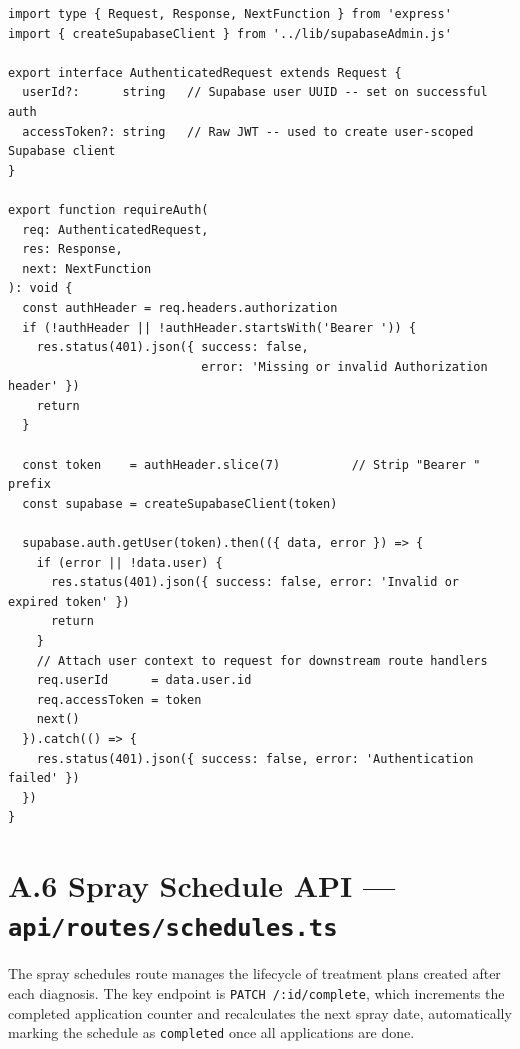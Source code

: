 \documentclass[12pt,a4paper]{report}
\begin{document}
\begin{lstlisting}[style=typescript, caption={JWT validation middleware for all protected API routes (api/middleware/auth.ts)}]
import type { Request, Response, NextFunction } from 'express'
import { createSupabaseClient } from '../lib/supabaseAdmin.js'

export interface AuthenticatedRequest extends Request {
  userId?:      string   // Supabase user UUID -- set on successful auth
  accessToken?: string   // Raw JWT -- used to create user-scoped Supabase client
}

export function requireAuth(
  req: AuthenticatedRequest,
  res: Response,
  next: NextFunction
): void {
  const authHeader = req.headers.authorization
  if (!authHeader || !authHeader.startsWith('Bearer ')) {
    res.status(401).json({ success: false,
                           error: 'Missing or invalid Authorization header' })
    return
  }

  const token    = authHeader.slice(7)          // Strip "Bearer " prefix
  const supabase = createSupabaseClient(token)

  supabase.auth.getUser(token).then(({ data, error }) => {
    if (error || !data.user) {
      res.status(401).json({ success: false, error: 'Invalid or expired token' })
      return
    }
    // Attach user context to request for downstream route handlers
    req.userId      = data.user.id
    req.accessToken = token
    next()
  }).catch(() => {
    res.status(401).json({ success: false, error: 'Authentication failed' })
  })
}
\end{lstlisting}

\newpage

\section*{A.6 \quad Spray Schedule API --- \texttt{api/routes/schedules.ts}}

The spray schedules route manages the lifecycle of treatment plans created after each diagnosis. The key endpoint is \texttt{PATCH /:id/complete}, which increments the completed application counter and recalculates the next spray date, automatically marking the schedule as \texttt{completed} once all applications are done.
\end{document}
